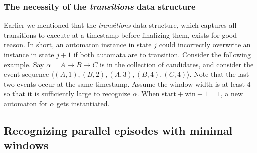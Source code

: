 \subsubsection{The necessity of the \emph{transitions} data structure}

Earlier we mentioned that the \emph{transitions} data structure, which captures all transitions to execute at a timestamp before finalizing them, exists for good reason. In short, an automaton instance in state $ j $ could incorrectly overwrite an instance in state $ j + 1 $ if both automata are to transition. Consider the following example. Say $ \alpha = A \to B \to C $ is in the collection of candidates, and consider the event sequence $ \langle (A, 1),\allowbreak(B, 2),\allowbreak(A, 3),\allowbreak(B, 4),\allowbreak(C, 4) \rangle $. Note that the last two events occur at the same timestamp. Assume the window width is at least 4 so that it is sufficiently large to recognize $ \alpha $. When $ \text{start} + \text{win} - 1 = 1 $, a new automaton for $ \alpha $ gets instantiated.


\subsection{Recognizing parallel episodes with minimal windows}

